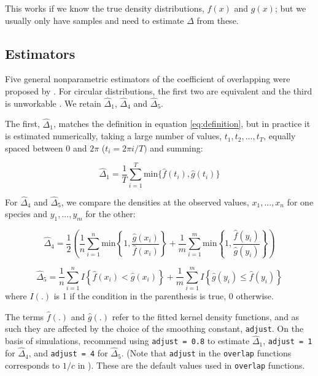 \documentclass[a4paper]{article}
\begin{document}
This works if we know the true density distributions, $f(x)$ and $g(x)$; but we usually only have samples and need to estimate $\Delta$ from these.

\subsection{Estimators}
\label{subsec:estimators}

Five general nonparametric estimators of the coefficient of overlapping were proposed by \citet{SchmidSchmidt2006}. For circular distributions, the first two are equivalent and the third is unworkable \citep{RidoutLinkie2009}. We retain $\hat{\Delta}_1$,  $\hat{\Delta}_4$ and $\hat{\Delta}_5$.

The first, $\hat{\Delta}_1$, matches the definition in equation \eqref{eq:definition}, but in practice it is estimated numerically, taking a large number of values, $t_1, t_2, ..., t_T$, equally spaced between 0 and $2\pi$ ($t_i = 2\pi i/T)$ and summing:

\begin{equation} \label{eq:Dhat1}
  \hat{\Delta}_1 = \frac{1}{T} \sum_{i=1}^T \textrm{min} \{ \hat{f}(t_i), \hat{g}(t_i) \}
\end{equation}

For $\hat{\Delta}_4$ and $\hat{\Delta}_5$, we compare the densities at the observed values, $x_1,...,x_n$ for one species and $y_1, ...,y_m$ for the other:

\begin{equation} \label{eq:Dhat4}
  \hat{\Delta}_4 = \frac{1}{2} \left( \frac{1}{n} \sum_{i=1}^n \textrm{min} \left\{ 1, \frac{\hat{g}(x_i)}{\hat{f}(x_i)}\right\} + \frac{1}{m} \sum_{i=1}^m \textrm{min} \left\{ 1, \frac{\hat{f}(y_i)}{\hat{g}(y_i)}\right\} \right)
\end{equation}

\begin{equation} \label{eq:Dhat5}
  \hat{\Delta}_5 = \frac{1}{n} \sum_{i=1}^n I \left\{ \hat{f}(x_i) < \hat{g}(x_i)\right\} + \frac{1}{m} \sum_{i=1}^m I \left\{ \hat{g}(y_i) \leq \hat{f}(y_i)\right\}
\end{equation}
where $I(.)$ is 1 if the condition in the parenthesis is true, 0 otherwise.

The terms $\hat{f}(.)$ and $\hat{g}(.)$ refer to the fitted kernel density functions, and as such they are affected by the choice of the smoothing constant, \texttt{adjust}. On the basis of simulations, \citet{RidoutLinkie2009} recommend using \texttt{adjust~=~0.8} to estimate $\hat{\Delta}_1$, \texttt{adjust~=~1} for $\hat{\Delta}_4$, and \texttt{adjust~=~4} for $\hat{\Delta}_5$. (Note that \texttt{adjust} in the \texttt{overlap} functions corresponds to $1/c$ in \citet{RidoutLinkie2009}). These are the default values used in \texttt{overlap} functions.
\end{document}
